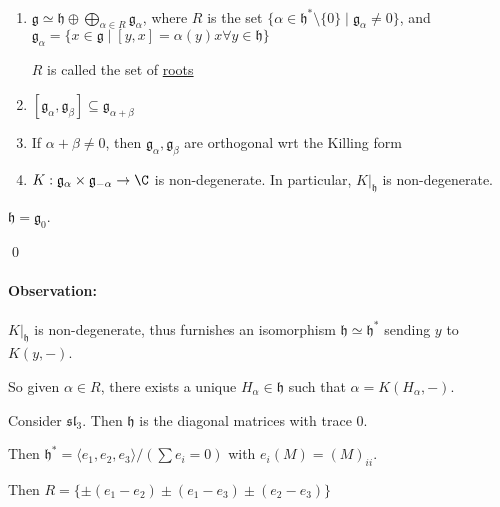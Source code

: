 \documentclass[x11names,reqno,14pt]{extarticle}
\newcommand{\mk}[1]{\mathfrak{#1}}
\newcommand{\g}{\mk{g}}
\newcommand{\h}{\mk{h}}
\renewcommand{\sl}{\mk{s}\mk{l}}
\begin{document}
\thm
\,
\begin{enumerate}

\item $\g \simeq \h \oplus \bigoplus_{\alpha\in R}\g_\alpha$, where $R$ is the set $\{\alpha \in \mk{h}^*\setminus\{0\}\mid \g_\alpha\neq0\}$, and $\g_\alpha = \{x\in \g \mid [y, x] = \alpha(y)x\forall y \in \h\}$ 

$R$ is called the set of \underline{roots}

\item $[\g_\alpha,\g_\beta] \subseteq \g_{\alpha+\beta}$

\item If $\alpha+\beta\neq 0$, then $\g_\alpha,\g_\beta$ are orthogonal wrt the Killing form

\item $K:\g_\alpha\times\g_{-\alpha}\to\C$ is non-degenerate. In particular, $K|_{\h}$ is non-degenerate.

\end{enumerate}

\proof

$\h = \g_0$. 

\qed

\paragraph{Observation:} $K|_{\h}$ is non-degenerate, thus furnishes an isomorphism $\h\simeq\h^*$ sending $y$ to $K(y,-)$.

So given $\alpha \in R$, there exists a unique $H_\alpha \in \h$ such that $\alpha = K(H_\alpha,-)$. 

\exm

Consider $\sl_3$. Then $\h$ is the diagonal matrices with trace 0.

Then $\h^* = \langle e_1, e_2, e_3\rangle/(\sum e_i = 0)$ with $e_i(M) = (M)_{ii}$. 

Then $R = \{\pm(e_1 - e_2) \pm (e_1 - e_3) \pm (e_2 - e_3)\}$
\end{document}

